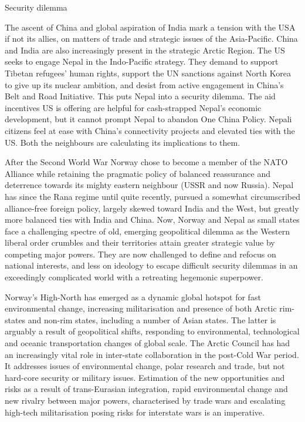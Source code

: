 \documentclass[
  openany]{book}
\begin{document}
Security dilemma

The ascent of China and global aspiration of India mark a tension with the USA if not its allies, on matters of trade and strategic issues of the Asia-Pacific. China and India are also increasingly present in the strategic Arctic Region. The US seeks to engage Nepal in the Indo-Pacific strategy. They demand to support Tibetan refugees' human rights, support the UN sanctions against North Korea to give up its nuclear ambition, and desist from active engagement in China's Belt and Road Initiative. This puts Nepal into a security dilemma. The aid incentives US is offering are helpful for cash-strapped Nepal's economic development, but it cannot prompt Nepal to abandon One China Policy. Nepali citizens feel at ease with China's connectivity projects and elevated ties with the US. Both the neighbours are calculating its implications to them.

After the Second World War Norway chose to become a member of the NATO Alliance while retaining the pragmatic policy of balanced reassurance and deterrence towards its mighty eastern neighbour (USSR and now Russia). Nepal has since the Rana regime until quite recently, pursued a somewhat circumscribed alliance-free foreign policy, largely skewed toward India and the West, but greatly more balanced ties with India and China. Now, Norway and Nepal as small states face a challenging spectre of old, emerging geopolitical dilemma as the Western liberal order crumbles and their territories attain greater strategic value by competing major powers. They are now challenged to define and refocus on national interests, and less on ideology to escape difficult security dilemmas in an exceedingly complicated world with a retreating hegemonic superpower.

Norway's High-North has emerged as a dynamic global hotspot for fast environmental change, increasing militarisation and presence of both Arctic rim-states and non-rim states, including a number of Asian states. The latter is arguably a result of geopolitical shifts, responding to environmental, technological and oceanic transportation changes of global scale. The Arctic Council has had an increasingly vital role in inter-state collaboration in the post-Cold War period. It addresses issues of environmental change, polar research and trade, but not hard-core security or military issues. Estimation of the new opportunities and risks as a result of trans-Eurasian integration, rapid environmental change and new rivalry between major powers, characterised by trade wars and escalating high-tech militarisation posing risks for interstate wars is an imperative.
\end{document}
